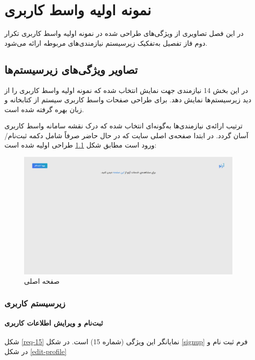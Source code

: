 \chapter{نمونه اولیه واسط کاربری}
در این فصل تصاویری از ویژگی‌های طراحی شده در نمونه اولیه واسط کاربری تکرار دوم فاز تفصیل به‌تفکیک زیرسیستم نیازمندی‌های مربوطه ارائه می‌شود.
\section{تصاویر ویژگی‌های زیرسیستم‌ها}
در این بخش 14 نیازمندی جهت نمایش انتخاب شده که نمونه اولیه واسط کاربری را از دید زیرسیستم‌ها نمایش دهد.
برای طراحی صفحات واسط کاربری سیستم از کتابخانه  و زبان  بهره گرفته شده است.

ترتیب ارائه‌ی نیازمندی‌ها به‌گونه‌ای انتخاب شده که درک نقشه سامانه واسط کاربری آسان گردد. در ابتدا صفحه‌ی اصلی سایت که در حال حاضر صرفاً شامل دکمه ثبت‌نام/ورود است مطابق شکل \ref{homepage} طراحی اولیه شده است:

\begin{figure}[h]
	\centering
	\includegraphics[width=\textwidth]{figs/initial-ui/homepage}
	\caption{صفحه اصلی}
	\label{homepage}
\end{figure}

\subsection{زیرسیستم کاربری}

\subsubsection{‌ثبت‌نام و ویرایش اطلاعات کاربری}
شکل
\ref{req-15}
نمایانگر این ویژگی (شماره 15) است. در شکل
\ref{signup}
فرم ثبت نام و در شکل
\ref{edit-profile}


